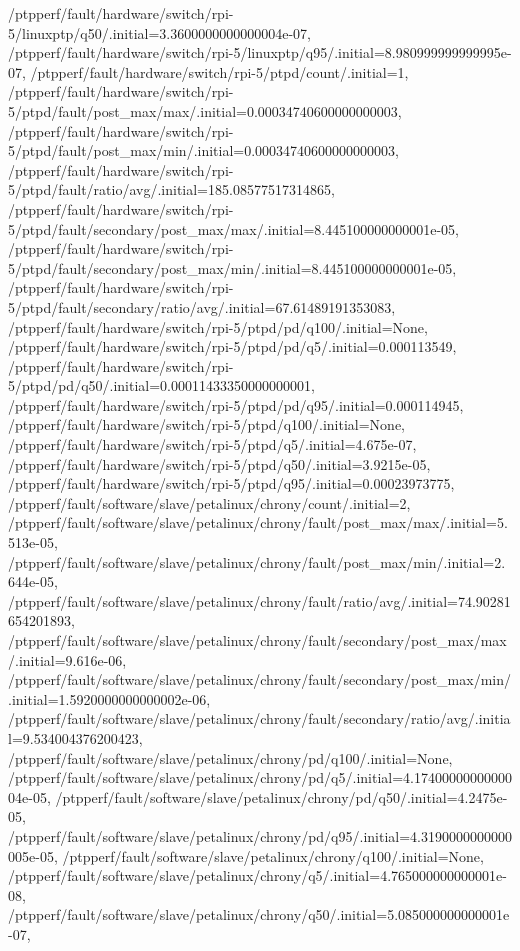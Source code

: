 {    /ptpperf/fault/hardware/switch/rpi-5/linuxptp/q50/.initial=3.3600000000000004e-07,
    /ptpperf/fault/hardware/switch/rpi-5/linuxptp/q95/.initial=8.980999999999995e-07,
    /ptpperf/fault/hardware/switch/rpi-5/ptpd/count/.initial=1,
    /ptpperf/fault/hardware/switch/rpi-5/ptpd/fault/post_max/max/.initial=0.00034740600000000003,
    /ptpperf/fault/hardware/switch/rpi-5/ptpd/fault/post_max/min/.initial=0.00034740600000000003,
    /ptpperf/fault/hardware/switch/rpi-5/ptpd/fault/ratio/avg/.initial=185.08577517314865,
    /ptpperf/fault/hardware/switch/rpi-5/ptpd/fault/secondary/post_max/max/.initial=8.445100000000001e-05,
    /ptpperf/fault/hardware/switch/rpi-5/ptpd/fault/secondary/post_max/min/.initial=8.445100000000001e-05,
    /ptpperf/fault/hardware/switch/rpi-5/ptpd/fault/secondary/ratio/avg/.initial=67.61489191353083,
    /ptpperf/fault/hardware/switch/rpi-5/ptpd/pd/q100/.initial=None,
    /ptpperf/fault/hardware/switch/rpi-5/ptpd/pd/q5/.initial=0.000113549,
    /ptpperf/fault/hardware/switch/rpi-5/ptpd/pd/q50/.initial=0.00011433350000000001,
    /ptpperf/fault/hardware/switch/rpi-5/ptpd/pd/q95/.initial=0.000114945,
    /ptpperf/fault/hardware/switch/rpi-5/ptpd/q100/.initial=None,
    /ptpperf/fault/hardware/switch/rpi-5/ptpd/q5/.initial=4.675e-07,
    /ptpperf/fault/hardware/switch/rpi-5/ptpd/q50/.initial=3.9215e-05,
    /ptpperf/fault/hardware/switch/rpi-5/ptpd/q95/.initial=0.00023973775,
    /ptpperf/fault/software/slave/petalinux/chrony/count/.initial=2,
    /ptpperf/fault/software/slave/petalinux/chrony/fault/post_max/max/.initial=5.513e-05,
    /ptpperf/fault/software/slave/petalinux/chrony/fault/post_max/min/.initial=2.644e-05,
    /ptpperf/fault/software/slave/petalinux/chrony/fault/ratio/avg/.initial=74.90281654201893,
    /ptpperf/fault/software/slave/petalinux/chrony/fault/secondary/post_max/max/.initial=9.616e-06,
    /ptpperf/fault/software/slave/petalinux/chrony/fault/secondary/post_max/min/.initial=1.5920000000000002e-06,
    /ptpperf/fault/software/slave/petalinux/chrony/fault/secondary/ratio/avg/.initial=9.534004376200423,
    /ptpperf/fault/software/slave/petalinux/chrony/pd/q100/.initial=None,
    /ptpperf/fault/software/slave/petalinux/chrony/pd/q5/.initial=4.1740000000000004e-05,
    /ptpperf/fault/software/slave/petalinux/chrony/pd/q50/.initial=4.2475e-05,
    /ptpperf/fault/software/slave/petalinux/chrony/pd/q95/.initial=4.3190000000000005e-05,
    /ptpperf/fault/software/slave/petalinux/chrony/q100/.initial=None,
    /ptpperf/fault/software/slave/petalinux/chrony/q5/.initial=4.765000000000001e-08,
    /ptpperf/fault/software/slave/petalinux/chrony/q50/.initial=5.085000000000001e-07,
}

